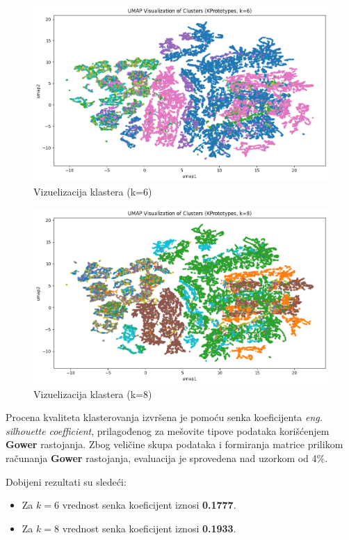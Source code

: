 \documentclass[a4paper,12pt]{article}
\begin{document}
\begin{figure}[htbp]
    	\centering
    	\includegraphics[width=1\textwidth]{./images/umap_clusters1.png}
    	\caption{Vizuelizacija klastera (k=6)}
    	\label{Slika:clusters1}
\end{figure}
\begin{figure}[htbp]
    	\centering
    	\includegraphics[width=1\textwidth]{./images/umap_clusters2.png}
    	\caption{Vizuelizacija klastera (k=8)}
    	\label{Slika:clusters2}
\end{figure}
\newpage

Procena kvaliteta klasterovanja izvršena je pomoću senka koeficijenta \textit{eng. silhouette coefficient}, prilagođenog za mešovite tipove podataka korišćenjem \textbf{Gower} rastojanja. Zbog veličine skupa podataka i formiranja matrice prilikom računanja \textbf{Gower} rastojanja, evaluacija je sprovedena nad uzorkom od 4\%. 

Dobijeni rezultati su sledeći:
\begin{itemize}
    \item Za $k=6$ vrednost senka koeficijent iznosi \textbf{0.1777}.
    \item Za $k=8$ vrednost senka koeficijent iznosi \textbf{0.1933}.
\end{itemize}
\end{document}

